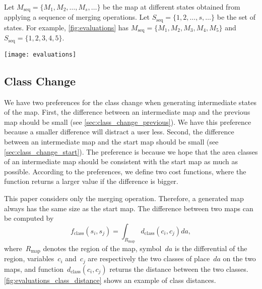 \documentclass[ijgi,article,submit,moreauthors,pdftex]{Definitions/mdpi}
\begin{document}
Let $M_\mathrm{seq} = \{M_1, M_2, \dots, M_s, \dots\}$ be the map
at different states obtained from 
applying a sequence of merging operations.
Let $S_\mathrm{seq} = \{1, 2, \dots, s, \dots\}$ be the set of states.
For example, \fig\ref{fig:evaluations} has 
$M_\mathrm{seq} = \{M_1, M_2, M_3, M_4, M_5\}$ and
$S_\mathrm{seq} = \{1, 2, 3, 4, 5\}$.



\begin{figure*}[tb]
\centering
\texttt{[image: evaluations]}
\caption{Some examples to illustrate how to compute the costs of an aggregation sequence.
}
\label{fig:evaluations}
\end{figure*}


\subsection{Class Change}



We have two preferences for the class change 
when generating intermediate states of the map.
First, the difference between an intermediate map and 
the previous map should be small 
(see \sect\ref{sec:class_change_previous}).
We have this preference because a smaller difference
will distract a user less.
Second, the difference between an intermediate map and the start map
should be small (see \sect\ref{sec:class_change_start}).
The preference is because we hope that the area classes of an intermediate map 
should be consistent with the start map as much as possible.
According to the preferences,
we define two cost functions, where the function returns a larger value
if the difference is bigger.

This paper considers only the merging operation.
Therefore, a generated map always has the same size as the start map.
The difference between two maps can be computed by
\begin{equation}
\label{eq:f_integral}
f_\mathrm{class} (s_i, s_j) = \int_{R_\mathrm{map}}
d_\mathrm{class}(c_i,c_j) da,
\end{equation}
where~$R_\mathrm{map}$ denotes the region of the map,
symbol~$da$ is the differential of the region,
variables~$c_i$ and~$c_j$ are respectively
the two classes of place~$da$ on the two maps, 
and function~$d_\mathrm{class}(c_i,c_j)$ 
returns the distance between the two classes.
\fig\ref{fig:evaluations_class_distance} shows an example of class distances.
\end{document}
